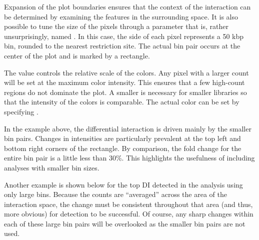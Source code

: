 \documentclass{report}\usepackage[]{graphicx}\usepackage[usenames,dvipsnames]{color}
\begin{document}
Expansion of the plot boundaries ensures that the context of the interaction can be determined by examining the features in the surrounding space. 
It is also possible to tune the size of the pixels through a parameter that is, rather unsurprisingly, named .
In this case, the side of each pixel represents a 50 kbp bin, rounded to the nearest restriction site.
The actual bin pair occurs at the center of the plot and is marked by a rectangle.

The  value controls the relative scale of the colors. 
Any pixel with a larger count will be set at the maximum color intensity.
This ensures that a few high-count regions do not dominate the plot.
A smaller  is necessary for smaller libraries so that the intensity of the colors is comparable.
The actual color can be set by specifying .

In the example above, the differential interaction is driven mainly by the smaller bin pairs.
Changes in intensities are particularly prevalent at the top left and bottom right corners of the rectangle.
By comparison, the fold change for the entire bin pair is a little less than 30\%.
This highlights the usefulness of including analyses with smaller bin sizes.

Another example is shown below for the top DI detected in the analysis using only large bins.
Because the counts are ``averaged'' across the area of the interaction space, the change must be consistent throughout that area (and thus, more obvious) for detection to be successful.
Of course, any sharp changes within each of these large bin pairs will be overlooked as the smaller bin pairs are not used.
\end{document}
